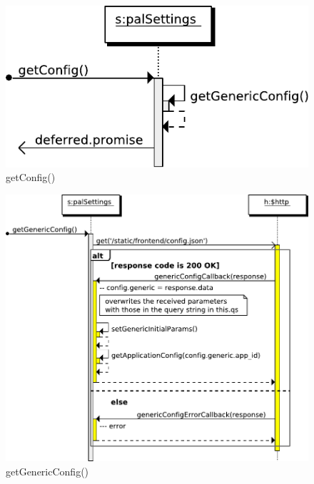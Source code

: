 \begin{figure}[htb]
    \centering
    \includegraphics{figures/design/seqdia/palSettings-getConfig.pdf}
    \caption{getConfig()}
    \label{fig:design-seqdia-palSettings-getConfig}
\end{figure}

\begin{figure}[htb]
    \centering
    \includegraphics{figures/design/seqdia/palSettings-getGenericConfig.pdf}
    \caption{getGenericConfig()}
    \label{fig:design-seqdia-palSettings-getGenericConfig}
\end{figure}

